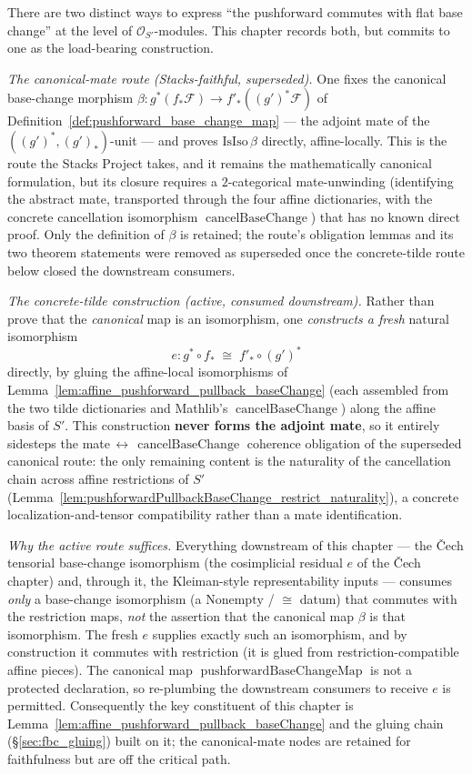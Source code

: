There are two distinct ways to express ``the pushforward commutes with flat base
change'' at the level of \(\mathcal{O}_{S'}\)-modules. This chapter records both, but
commits to one as the load-bearing construction.

\emph{The canonical-mate route (Stacks-faithful, superseded).} One fixes
the canonical base-change morphism
\(\beta : g^*(f_*\mathcal{F}) \to f'_*((g')^*\mathcal{F})\) of
Definition~\ref{def:pushforward_base_change_map} --- the adjoint mate of the
\(((g')^*,(g')_*)\)-unit --- and proves \(\mathrm{IsIso}\,\beta\) directly,
affine-locally. This is the route the Stacks Project takes, and it remains the
mathematically canonical formulation, but its closure requires a \(2\)-categorical
mate-unwinding (identifying the abstract mate, transported through the four affine
dictionaries, with the concrete cancellation isomorphism
\(\operatorname{cancelBaseChange}\)) that has no known direct proof. Only the
definition of \(\beta\) is retained; the route's obligation lemmas and its two
theorem statements were removed as superseded once the concrete-tilde route below
closed the downstream consumers.

\emph{The concrete-tilde construction (active, consumed downstream).} Rather than prove
that the \emph{canonical} map is an isomorphism, one \emph{constructs a fresh} natural
isomorphism
\[
  e : g^* \circ f_* \;\cong\; f'_* \circ (g')^*
\]
directly, by gluing the affine-local isomorphisms of
Lemma~\ref{lem:affine_pushforward_pullback_baseChange} (each assembled from the two
tilde dictionaries and Mathlib's \(\operatorname{cancelBaseChange}\)) along the affine
basis of \(S'\). This construction \textbf{never forms the adjoint mate}, so it
entirely sidesteps the mate\(\,\leftrightarrow\,\operatorname{cancelBaseChange}\)
coherence obligation of the superseded canonical route: the only remaining
content is the naturality of the cancellation chain across affine restrictions of
\(S'\) (Lemma~\ref{lem:pushforwardPullbackBaseChange_restrict_naturality}), a concrete
localization-and-tensor compatibility rather than a mate identification.

\emph{Why the active route suffices.} Everything downstream of this chapter --- the
{\v C}ech tensorial base-change isomorphism (the cosimplicial residual \(e\) of the
{\v C}ech chapter) and, through it, the Kleiman-style representability inputs ---
consumes \emph{only} a base-change isomorphism (a \(\mathrm{Nonempty}\) / \(\cong\)
datum) that commutes with the restriction maps, \emph{not} the assertion that the
canonical map \(\beta\) is that isomorphism. The fresh \(e\) supplies exactly such an
isomorphism, and by construction it commutes with restriction (it is glued from
restriction-compatible affine pieces). The canonical map
\(\operatorname{pushforwardBaseChangeMap}\) is not a protected declaration, so
re-plumbing the downstream consumers to receive \(e\) is permitted. Consequently the
key constituent of this chapter is
Lemma~\ref{lem:affine_pushforward_pullback_baseChange} and the gluing chain
(\S\ref{sec:fbc_gluing}) built on it; the canonical-mate nodes are retained for
faithfulness but are off the critical path.

